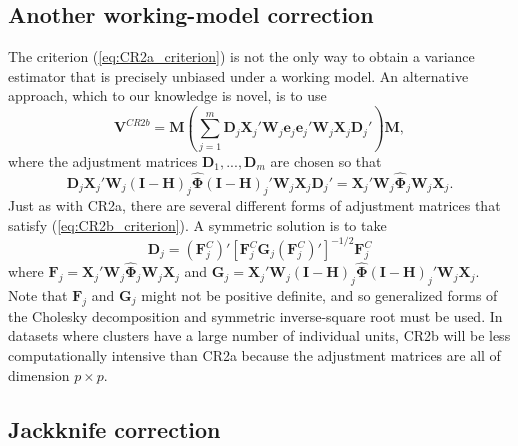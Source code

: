 \documentclass[12pt]{article}\usepackage[]{graphicx}\usepackage[]{color}
\newcommand{\bm}{\mathbf}
\newcommand{\bs}{\boldsymbol}
\begin{document}
\subsection{Another working-model correction}

The criterion (\ref{eq:CR2a_criterion}) is not the only way to obtain a variance estimator that is precisely unbiased under a working model. An alternative approach, which to our knowledge is novel, is to use
\begin{equation}
\label{eq:V_CR2b}
\bm{V}^{CR2b} = \bm{M} \left(\sum_{j=1}^m \bm{D}_j \bm{X}_j' \bm{W}_j \bm{e}_j \bm{e}_j' \bm{W}_j \bm{X}_j \bm{D}_j'\right) \bm{M},
\end{equation}
where the adjustment matrices $\bm{D}_1,...,\bm{D}_m$ are chosen so that
\begin{equation}
\label{eq:CR2b_criterion}
\bm{D}_j \bm{X}_j' \bm{W}_j \left(\bm{I} - \bm{H}\right)_j \hat{\bs\Phi} \left(\bm{I} - \bm{H}\right)_j' \bm{W}_j \bm{X}_j \bm{D}_j' = \bm{X}_j' \bm{W}_j \hat{\bs\Phi}_j \bm{W}_j \bm{X}_j.
\end{equation}
Just as with CR2a, there are several different forms of adjustment matrices that satisfy (\ref{eq:CR2b_criterion}). 
A symmetric solution is to take
\begin{equation}
\bm{D}_j = \left(\bm{F}_j^C\right)'\left[\bm{F}_j^C \bm{G}_j \left(\bm{F}_j^C\right)'\right]^{-1/2}\bm{F}_j^C
\end{equation}
where $\bm{F}_j = \bm{X}_j' \bm{W}_j \hat{\bs\Phi}_j \bm{W}_j \bm{X}_j$ and $\bm{G}_j = \bm{X}_j' \bm{W}_j \left(\bm{I} - \bm{H}\right)_j \hat{\bs\Phi} \left(\bm{I} - \bm{H}\right)_j' \bm{W}_j \bm{X}_j$. Note that $\bm{F}_j$ and $\bm{G}_j$ might not be positive definite, and so generalized forms of the Cholesky decomposition and symmetric inverse-square root must be used. In datasets where clusters have a large number of individual units, CR2b will be less computationally intensive than CR2a because the adjustment matrices are all of dimension $p \times p$.

\subsection{Jackknife correction}
\end{document}
